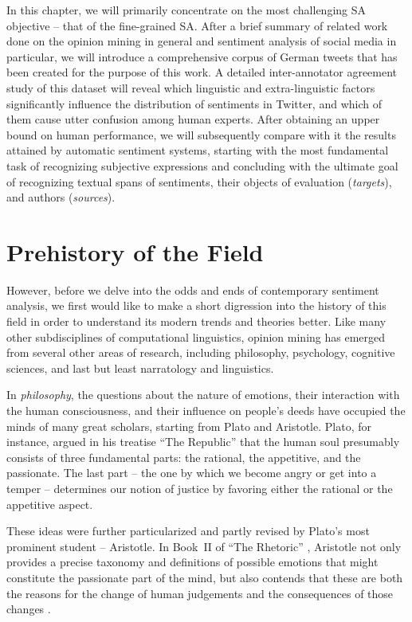 In this chapter, we will primarily concentrate on the most challenging
SA objective -- that of the fine-grained SA.  After a brief summary of
related work done on the opinion mining in general and sentiment
analysis of social media in particular, we will introduce a
comprehensive corpus of German tweets that has been created for the
purpose of this work.  A detailed inter-annotator agreement study of
this dataset will reveal which linguistic and extra-linguistic factors
significantly influence the distribution of sentiments in Twitter, and
which of them cause utter confusion among human experts.  After
obtaining an upper bound on human performance, we will subsequently
compare with it the results attained by automatic sentiment systems,
starting with the most fundamental task of recognizing subjective
expressions and concluding with the ultimate goal of recognizing
textual spans of sentiments, their objects of evaluation
(\emph{targets}), and authors (\emph{sources}).

\section{Prehistory of the Field}

However, before we delve into the odds and ends of contemporary
sentiment analysis, we first would like to make a short digression
into the history of this field in order to understand its modern
trends and theories better.  Like many other subdisciplines of
computational linguistics, opinion mining has emerged from several
other areas of research, including philosophy, psychology, cognitive
sciences, and last but least narratology and linguistics.

In \emph{philosophy}, the questions about the nature of emotions,
their interaction with the human consciousness, and their influence on
people's deeds have occupied the minds of many great scholars,
starting from Plato and Aristotle.  Plato, for instance, argued in his
treatise ``The Republic'' \citep[Book~IV]{Plato:91} that the human
soul presumably consists of three fundamental parts: the rational, the
appetitive, and the passionate.  The last part -- the one by which we
become angry or get into a temper -- determines our notion of justice
by favoring either the rational or the appetitive aspect.

These ideas were further particularized and partly revised by Plato's
most prominent student -- Aristotle.  In Book~II of ``The Rhetoric''
\citep{Aristotle:54}, Aristotle not only provides a precise taxonomy
and definitions of possible emotions that might constitute the
passionate part of the mind, but also contends that these are both the
reasons for the change of human judgements and the consequences of
those changes \cite[cf.][p. 157]{Leighton:82}.

